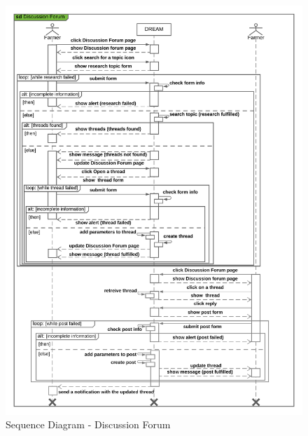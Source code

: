 \begin{center}
    \begin{figure}[H]
  \includegraphics[width=\textwidth,height=\textheight,keepaspectratio]{./Images/Sequence Diagram Discussion Forum.png}
       \vspace*{-0.9cm}
  \caption{Sequence Diagram - Discussion Forum}
\end{figure}
\end{center}




